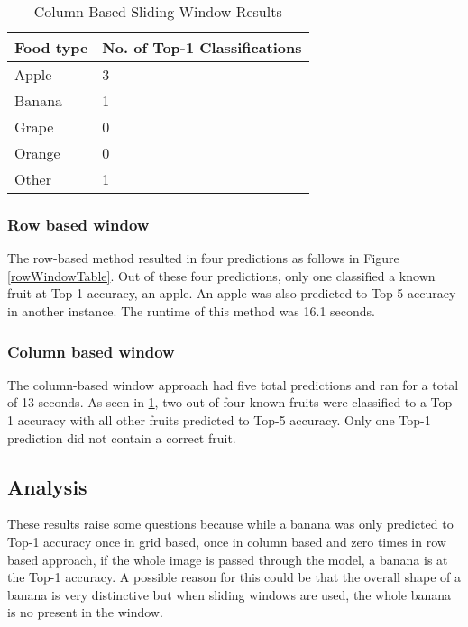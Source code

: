 \begin{table}[]
	\centering
	\caption{Column Based Sliding Window Results}
	\label{colWindowTable}
	\begin{tabular}{|l|l|}
	\hline
		\textbf{Food type} & \textbf{No. of Top-1 Classifications} \\ \hline
		Apple     & 3                      \\ \hline
		Banana    & 1                      \\ \hline
		Grape     & 0                      \\ \hline
		Orange    & 0                      \\ \hline
		Other     & 1                     \\ \hline
	\end{tabular}
\end{table}

\tocless\subsubsection{Row based window}
The row-based method resulted in four predictions as follows in Figure
\ref{rowWindowTable}. Out of these four predictions, only one classified a known
fruit at Top-1 accuracy, an apple. An apple was also predicted to Top-5 accuracy
in another instance. The runtime of this method was 16.1 seconds.

\tocless\subsubsection{Column based window}
The column-based window approach had five total predictions and ran for a total
of 13 seconds. As seen in \ref{colWindowTable}, two out of four known fruits
were classified to a Top-1 accuracy with all other fruits predicted to Top-5
accuracy. Only one Top-1 prediction did not contain a correct fruit.

\tocless\subsection{Analysis}
These results raise some questions because while a banana was only predicted to
Top-1 accuracy once in grid based, once in column based and zero times in row
based approach, if the whole image is passed through the model, a banana is at the Top-1 accuracy.
A possible reason for this could be that the overall shape of a banana is very distinctive but when sliding windows are used, the whole banana is no present in the window.
























